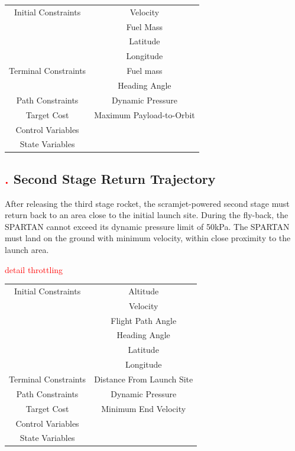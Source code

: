 \begin{table}[ht]
\begin{tabular}{|c|c|}
	\hline Initial Constraints  & Velocity \\ & Fuel Mass  \\ & Latitude \\ & Longitude \\ 
	\hline Terminal Constraints & Fuel mass \\ & Heading Angle \\ 
	\hline Path Constraints & Dynamic Pressure \\ 
	\hline Target Cost & Maximum Payload-to-Orbit \\ 
			\hline Control Variables &  \\ 
			\hline State Variables &  \\ 
	\hline 
\end{tabular} 

\end{table}

\subsection{\textcolor{red}{.} Second Stage Return Trajectory}
After releasing the third stage rocket, the scramjet-powered second stage must return back to an area close to the initial launch site.
During the fly-back, the SPARTAN cannot exceed its dynamic pressure limit of 50kPa. 
The SPARTAN must land on the ground with minimum velocity, within close proximity to the launch area.
 
\textcolor{red}{detail throttling}


\begin{tabular}{|c|c|}
	\hline Initial Constraints  & Altitude \\ & Velocity\\ & Flight Path Angle\\ & Heading Angle\\ & Latitude\\ & Longitude\\ 
	\hline Terminal Constraints &  Distance From Launch Site \\ 
	\hline Path Constraints & Dynamic Pressure \\ 
	\hline Target Cost & Minimum End Velocity \\ 
				\hline Control Variables &  \\ 
				\hline State Variables &  \\ 
	\hline 
\end{tabular} 




